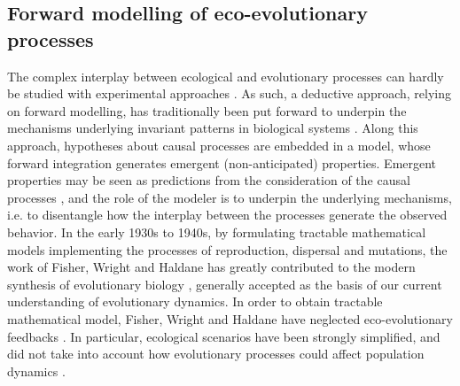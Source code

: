 \subsection{Forward modelling of eco-evolutionary processes}
The complex interplay between ecological and evolutionary processes can hardly be studied with experimental approaches \citep{Pontarp2019,Hagen2022}. 
As such, a deductive approach, relying on forward modelling, has traditionally been put forward to underpin the mechanisms underlying invariant patterns in biological systems \citep{Brummitt2020}. Along this approach, hypotheses about causal processes are embedded in a model, whose forward integration generates emergent (non-anticipated) properties. Emergent properties may be seen as predictions from the consideration of the causal processes \citep{May2004}, and the role of the modeler is to underpin the underlying mechanisms, i.e. to disentangle how the interplay between the processes generate the observed behavior. 
% 
% 
In the early 1930s to 1940s, by formulating tractable mathematical models implementing the processes of reproduction, dispersal and mutations, the work of Fisher, Wright and Haldane has greatly contributed to the modern synthesis of evolutionary biology \citep{huxley1942evolution}, generally accepted as the basis of our current understanding of evolutionary dynamics. 
% 
% 
In order to obtain tractable mathematical model, Fisher, Wright and Haldane have neglected eco-evolutionary feedbacks \citep{Govaert2019a}. In particular, ecological scenarios have been strongly simplified, and did not take into account how evolutionary processes could affect population dynamics \citep{Lion2022}.

